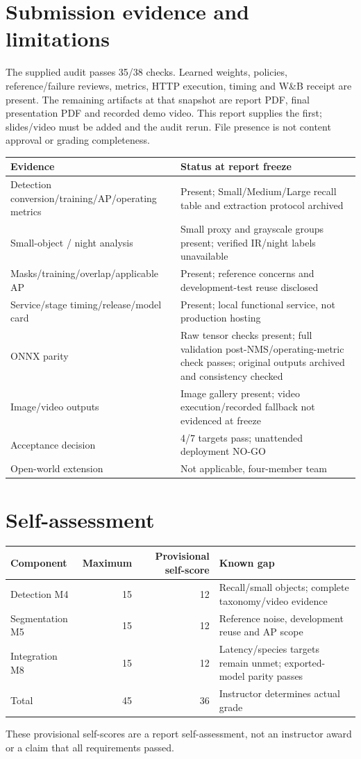 \documentclass[11pt,a4paper]{article}
\begin{document}
\section{Submission evidence and limitations}
The supplied audit passes 35/38 checks. Learned weights, policies, reference/failure reviews, metrics, HTTP execution, timing and W\&B receipt are present. The remaining artifacts at that snapshot are report PDF, final presentation PDF and recorded demo video. This report supplies the first; slides/video must be added and the audit rerun. File presence is not content approval or grading completeness.
\par\noindent\begin{tabularx}{\linewidth}{@{}Y Y@{}}\toprule
Evidence & Status at report freeze\\\midrule
Detection conversion/training/AP/operating metrics & Present; Small/Medium/Large recall table and extraction protocol archived\\
Small-object / night analysis & Small proxy and grayscale groups present; verified IR/night labels unavailable\\
Masks/training/overlap/applicable AP & Present; reference concerns and development-test reuse disclosed\\
Service/stage timing/release/model card & Present; local functional service, not production hosting\\
ONNX parity & Raw tensor checks present; full validation post-NMS/operating-metric check passes; original outputs archived and consistency checked\\
Image/video outputs & Image gallery present; video execution/recorded fallback not evidenced at freeze\\
Acceptance decision & 4/7 targets pass; unattended deployment NO-GO\\
Open-world extension & Not applicable, four-member team\\\bottomrule
\end{tabularx}\par

\section{Self-assessment}
\par\noindent\begin{tabularx}{\linewidth}{@{}Y r r Y@{}}\toprule
Component & Maximum & Provisional self-score & Known gap\\\midrule
Detection M4 & 15 & 12 & Recall/small objects; complete taxonomy/video evidence\\
Segmentation M5 & 15 & 12 & Reference noise, development reuse and AP scope\\
Integration M8 & 15 & 12 & Latency/species targets remain unmet; exported-model parity passes\\\midrule
Total & 45 & 36 & Instructor determines actual grade\\\bottomrule
\end{tabularx}\par
These provisional self-scores are a report self-assessment, not an instructor award or a claim that all requirements passed.
\end{document}
